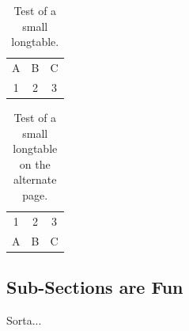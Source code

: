 \begin{landscape}
\begin{longtable}{|>{\centering}p{1.02in}|>{\centering}p{1.15in}|>{\centering}p{1in}|>{\centering}p{0.7in}|>{\centering}p{0.7in}|>{\centering}p{0.67in}|>{\centering}p{2.55in}|}
\end{longtable}
\end{landscape}

\begin{landscape}
\begin{longtable}{|c|c|c|}
	\endfirsthead
	\caption{Test of a small longtable.} \\
	\hline
	A & B & C \\
	\hline
	1 & 2 & 3 \\
	\hline
\end{longtable}
\end{landscape}

\begin{landscape}
\begin{longtable}{|c|c|c|}
	\endfirsthead
	\caption{Test of a small longtable on the alternate page.} \\
	\hline
	1 & 2 & 3 \\
	\hline
	A & B & C \\
	\hline
\end{longtable}
\end{landscape}

\subsection{Sub-Sections are Fun}
Sorta...

